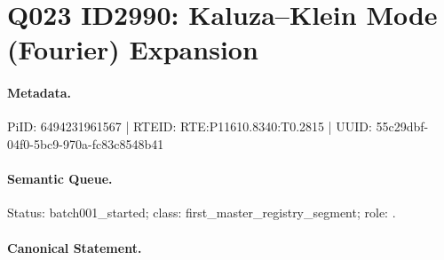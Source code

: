 \section*{Q023 ID2990: Kaluza–Klein Mode (Fourier) Expansion}
\paragraph{Metadata.}
PiID: 6494231961567 | RTEID: RTE:P11610.8340:T0.2815 | UUID: 55c29dbf-04f0-5bc9-970a-fc83c8548b41

\paragraph{Semantic Queue.}
Status: batch001\_started; class: first\_master\_registry\_segment; role: .

\paragraph{Canonical Statement.}
